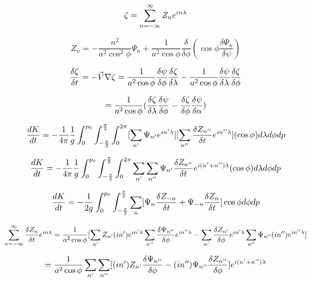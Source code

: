 \documentclass{article}
\begin{document}
\begin{equation}
\zeta = \sum_{n=-\infty}^{\infty} Z_n e^{in\lambda}
\end{equation}

\begin{equation}
Z_n = - \frac{n^2}{a^2 \cos^2{\phi}} \Psi_n + \frac{1}{a^2 \cos{\phi}} \frac{\delta}{\delta \phi} ( \cos{\phi} \frac{\delta \Psi_n}{\delta \psi} )
\end{equation}

\begin{equation}
\frac{\delta \zeta}{\delta t} = - \vec{V} \nabla \zeta = \frac{1}{a^2 \cos{\phi}} \frac{\delta \psi}{\delta \phi} \frac{\delta \zeta}{\delta \lambda} - \frac{1}{a^2 \cos{\phi}} \frac{\delta \psi}{\delta \lambda} \frac{\delta \zeta}{\delta \phi}
\end{equation}

\begin{equation}
= \frac{1}{a^2 \cos{\phi}} (\frac{\delta \zeta}{\delta \lambda} \frac{\delta \psi}{\delta \phi} - \frac{\delta \zeta}{\delta \phi} \frac{\delta \psi}{\delta \alpha} )
\end{equation}

\begin{equation}
\frac{dK}{dt} = - \frac{1}{4\pi} \frac{1}{g} \int_{0}^{p_0}  \int_{-\frac{\pi}{2}}^{\frac{\pi}{2}} \int_{0}^{2\pi} [ \sum_{n'} \Psi_{n'} e^{in'\lambda} ] [ \sum_{n''} \frac{\delta Z_{n''}}{\delta t} e^{in''\lambda} ] (\cos{\phi}) d\lambda d\phi dp
\end{equation}

\begin{equation}
\frac{dK}{dt} = - \frac{1}{4\pi} \frac{1}{g} \int_{0}^{p_0} \int_{-\frac{\pi}{2}}^{\frac{\pi}{2}} \int_{0}^{2\pi} \sum_{n'} \sum_{n''} \Psi_{n'} \frac{\delta Z_{n''}}{\delta t} e^{i(n'+n'')\lambda} (\cos{\phi}) d\lambda d\phi dp
\end{equation}

\begin{equation}
\frac{dK}{dt} = - \frac{1}{2g} \int_{0}^{p_0} \int_{-\frac{\pi}{2}}^{\frac{\pi}{2}} \sum_n [ \Psi_{n} \frac{\delta Z_{-n}}{\delta t} + \Psi_{-n} \frac{\delta Z_n}{\delta t} ] \cos{\phi} d\phi dp
\end{equation}

\begin{equation}
\sum_{n=-\infty}^{\infty} \frac{\delta Z_n}{\delta t} e^{in\lambda} = \frac{1}{a^2 \cos{\phi}}  [ \sum_{n'}  Z_{n'} (in') e^{in'\lambda} \sum_{n''} \frac{\delta \Psi_{n''}}{\delta \phi} e^{in''\lambda} - \sum_{n'} \frac{\delta Z_{n'}}{\delta \phi} e^{in'\lambda} \sum_{n''} \Psi_{n''} (in'') e^{in''\lambda} ]
\end{equation}

\begin{equation}
= \frac{1}{a^2 \cos{\phi}} \sum_{n'} \sum_{n''} [ (in') Z_{n'} \frac{\delta \Psi_{n''}}{\delta \phi} - (in'') \Psi_{n''} \frac{\delta Z_{n''}}{\delta \phi} ] e^{i(n'+n'')\lambda}
\end{equation}
\end{document}
